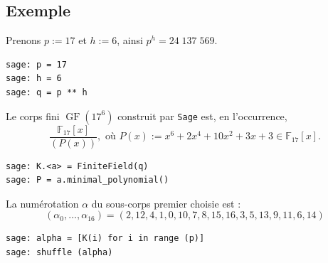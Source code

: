 \documentclass[a4paper, titlepage, 11pt]{article}
\theoremstyle{definition}
\theoremstyle{remark}
\def\F{\mathbb F}
\def\gf{\operatorname{GF}}
\begin{document}
\subsection{Exemple}
Prenons $p := 17$ et $h := 6$, ainsi $p^h = 24\;137\;569$.
\begin{verbatim}
sage: p = 17
sage: h = 6
sage: q = p ** h
\end{verbatim}
Le corps fini $\gf(17^6)$ construit par \verb|Sage| est, en l’occurrence, 
$$\frac{\F_{17}[x]}{(P(x))}, \text{ où } P(x) := x^6 + 2x^4 + 10 x^2 +3x +3\in  \F_{17}[x].$$
\begin{verbatim}
sage: K.<a> = FiniteField(q)
sage: P = a.minimal_polynomial()
\end{verbatim}
La numérotation $\alpha$ du sous-corps premier choisie est :
$$(\alpha_0, \dots, \alpha_{16}) = (2, 12, 4, 1, 0, 10, 7, 8, 15, 16, 3, 5, 13, 9, 11, 6, 14)$$
\begin{verbatim}
sage: alpha = [K(i) for i in range (p)]
sage: shuffle (alpha)
\end{verbatim}
\end{document}
